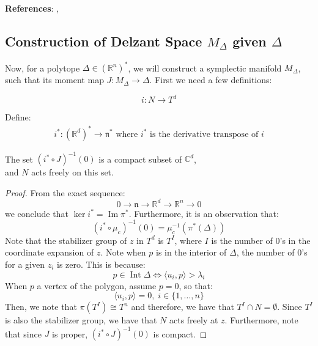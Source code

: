 \noindent \textbf{References}: \textcite{Silva2001} \textcite{Guillemin1994}, \textcite{Terek2020}

\subsection{Construction of Delzant Space $M_{\Delta}$ given $\Delta$}

Now, for a polytope $\Delta \in (\mathbb{R}^{n})^{*}$, we will construct a symplectic manifold $M_{\Delta}$, such that its moment map $J: M_{\Delta} \to \Delta$. First we need a few definitions:

\begin{defn}
$$i: N \to T^{d}$$
\end{defn}

\begin{defn}
Define: 
\begin{align}
i^{*}: (\mathbb{R}^{d})^* \to \mathfrak{n}^{*} \text{ where } i^{*} \text{ is the derivative transpose of } i
\end{align}
\end{defn}

\begin{lemma} 
The set $(i^{*} \circ J)^{-1}(0)$ is a compact subset of $\mathbb{C}^{d}$, \\
and $N$ acts freely on this set.
\end{lemma}

\begin{proof}
From the exact sequence:
\begin{equation}
0 \to \mathfrak{n} \to \mathbb{R}^{d} \to \mathbb{R}^{n} \to 0  
\end{equation}
we conclude that $\ker i^{*} = \operatorname{Im} \pi^{*}$. Furthermore, it is an observation that:  
\begin{equation}
\label{ImageofMDelta}
(i^{*} \circ \mu_{c})^{-1}(0) = \mu_{c}^{-1}(\pi^{*}(\Delta))
\end{equation}
Note that the stabilizer group of $z$ in $T^{d}$ is $T^{I}$, where $I$ is the number of $0$'s in the coordinate expansion of $z$. Note when $p$ is in the interior of $\Delta$, the number of $0$'s for a given $z_{i}$ is zero. This is because:
\begin{equation}
p \in \operatorname{Int} \Delta \Longleftrightarrow \langle u_{i}, p \rangle > \lambda_{i}
\end{equation}
When $p$ a vertex of the polygon, assume $p=0$, so that:
\begin{equation}
\langle u_{i}, p \rangle = 0, \; i \in \{1, \dots, n \}
\end{equation}
Then, we note that $\pi(T^{I}) \cong T^{n}$ and therefore, we have that $T^{I} \cap N = \emptyset$. Since $T^{I}$ is also the stabilizer group, we have that $N$ acts freely at $z$. Furthermore, note that since $J$ is proper, $(i^{*} \circ J)^{-1}(0)$ is compact.  
\end{proof}

